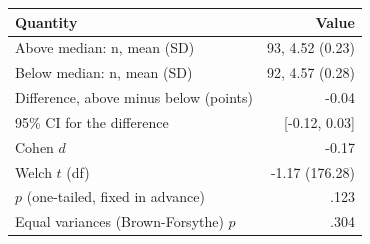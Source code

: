 \begin{tabular}{lr}
\toprule
Quantity & Value \\
\midrule
Above median: n, mean (SD) & 93, 4.52 (0.23) \\
Below median: n, mean (SD) & 92, 4.57 (0.28) \\
Difference, above minus below (points) & -0.04 \\
95\% CI for the difference & [-0.12, 0.03] \\
Cohen $d$ & -0.17 \\
Welch $t$ (df) & -1.17 (176.28) \\
$p$ (one-tailed, fixed in advance) & .123 \\
Equal variances (Brown-Forsythe) $p$ & .304 \\
\bottomrule
\end{tabular}
